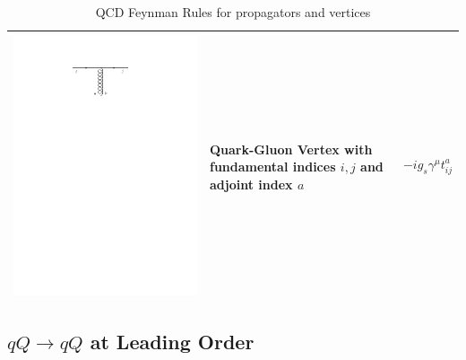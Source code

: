 \begin{table}[h!]
\begin{tabular}{ | c | m{5cm} | m{5cm} | }
\begin{minipage}{.3\textwidth}
      \includegraphics[scale=0.7]{Images/qg_vert.pdf}
    \end{minipage}
    \hspace{2pt}
    &
    Quark-Gluon Vertex with fundamental indices $i,j$ and adjoint index $a$
    & 
    \begin{minipage}{5cm}
    \centering
     $$  -i g_s \gamma^\mu t^a_{ij}$$
    \end{minipage}
    \\ [\VSpace]

    \hline
  \end{tabular}
  \caption{QCD Feynman Rules for propagators and vertices}\label{tab:QCD}
\end{table}

\subsection{$qQ \to qQ$ at Leading Order}

